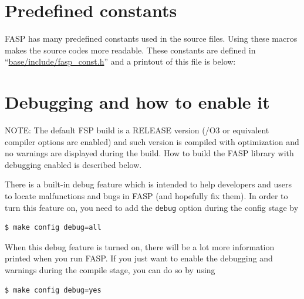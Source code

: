 \documentclass[11pt]{memoir}
\begin{document}
\section{Predefined constants}\label{sec:const}

FASP has many predefined constants used in the source files. 
Using these macros makes the source codes more readable. 
These constants are defined in ``\url{base/include/fasp\_const.h}''
and a printout of this file is below:
%


\section{Debugging and how to enable it}\label{sec:debug}

\begin{snugshade}\noindent
  NOTE: The default FSP build is a RELEASE version (/O3 or equivalent 
  compiler options are enabled) and such version
  is compiled with optimization and no warnings are displayed during
  the build. How to build the FASP library with debugging enabled is
  described below.
\end{snugshade}
%
There is a built-in debug feature which is intended to help developers
and users to locate malfunctions and bugs in FASP (and hopefully fix
them). In order to turn this feature on, you need to add the
\verb|debug| option during the config stage by
%
\begin{lstlisting}[numbers=none]
$ make config debug=all
\end{lstlisting}
%
When this debug feature is turned on, there will be a lot more
information printed when you run FASP.  If you just want to enable the
debugging and warnings during the compile stage, you can do so by
using
%
\begin{lstlisting}[numbers=none]
$ make config debug=yes
\end{lstlisting}
%


\end{document}
